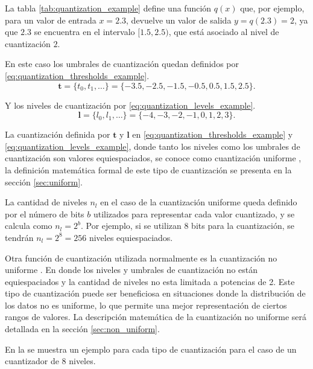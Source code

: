 La tabla \ref{tab:quantization_example} define una función $q(x)$ que, por ejemplo, para un valor de entrada $x = 2.3$, devuelve un valor de salida $y = q(2.3) = 2$, ya que $2.3$ se encuentra en el intervalo $[1.5, 2.5)$, que está asociado al nivel de cuantización $2$.

En este caso los umbrales de cuantización quedan definidos por \eqref{eq:quantization_thresholds_example}.
\begin{equation}
    \label{eq:quantization_thresholds_example}
    \mathbf{t} = \{t_0, t_1, \ldots\} = \{-3.5, -2.5, -1.5, -0.5, 0.5, 1.5, 2.5\}.
\end{equation}

Y los niveles de cuantización por \eqref{eq:quantization_levels_example}.
\begin{equation}
    \label{eq:quantization_levels_example}
    \mathbf{l} = \{l_0, l_1, \ldots\} = \{-4, -3, -2, -1, 0, 1, 2, 3\}.
\end{equation}

La cuantización definida por $\mathbf{t}$ y $\mathbf{l}$ en \eqref{eq:quantization_thresholds_example} y \eqref{eq:quantization_levels_example}, donde tanto los niveles como los umbrales de cuantización son valores equiespaciados, se conoce como cuantización uniforme \cite{sayood2017introduction}, la definición matemática formal de este tipo de cuantización se presenta en la sección \ref{sec:uniform}.

La cantidad de niveles $n_l$ en el caso de la cuantización uniforme queda definido por el número de bits $b$ utilizados para representar cada valor cuantizado, y se calcula como $n_{l} = 2^b$. Por ejemplo, si se utilizan 8 bits para la cuantización, se tendrán $n_{l} = 2^8 = 256$ niveles equiespaciados.

Otra función de cuantización utilizada normalmente es la cuantización no uniforme \cite{sayood2017introduction}. En donde los niveles y umbrales de cuantización no están equiespaciados y la cantidad de niveles no esta limitada a potencias de 2. Este tipo de cuantización puede ser beneficiosa en situaciones donde la distribución de los datos no es uniforme, lo que permite una mejor representación de ciertos rangos de valores. La descripción matemática de la cuantización no uniforme será detallada en la sección \ref{sec:non_uniform}.

En la  se muestra un ejemplo para cada tipo de cuantización para el caso de un cuantizador de 8 niveles.


